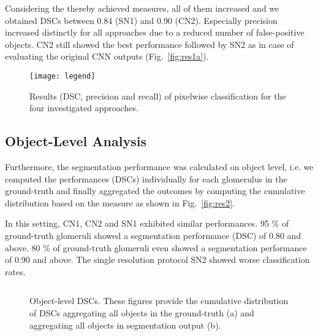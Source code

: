 \documentclass{elsarticle}
\begin{document}
Considering the thereby achieved measures, all of them increased and we obtained DSCs between 0.84 (SN1) and 0.90 (CN2). Especially precision increased distinctly for all approaches due to a reduced number of false-positive objects.
CN2 still showed the best performance followed by SN2 as in case of evaluating the original CNN outputs (Fig.~\ref{fig:res1a}).



\begin{figure} \center \texttt{[image: legend]}
	\caption{Results (DSC, precision and recall) of pixelwise classification for the four investigated approaches.}
	\label{fig:res1}
\end{figure}


\subsection{Object-Level Analysis} \label{sec:resObj}

Furthermore, the segmentation performance was calculated on object level, i.e. we computed the performances (DSCs) individually for each glomerulus in the ground-truth and finally aggregated the outcomes by computing the cumulative distribution based on the measure as shown in Fig.~\ref{fig:res2}.

In this setting, CN1, CN2 and SN1 exhibited similar performances. 95 \% of ground-truth glomeruli showed a segmentation performance (DSC) of 0.80 and above.
80 \% of ground-truth glomeruli even showed a segmentation performance of 0.90 and above. The single resolution protocol SN2 showed worse classification rates.

\begin{figure} \center
	 $\;$
	\caption{Object-level DSCs. These figures provide the cumulative distribution of DSCs aggregating all objects in the ground-truth (a) and aggregating all objects in segmentation output (b).}
\end{figure}
\end{document}
